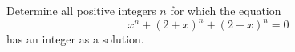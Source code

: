 Determine all positive integers $n$ for which the equation \[ x^n + (2+x)^n + (2-x)^n = 0 \] has an integer as a solution.